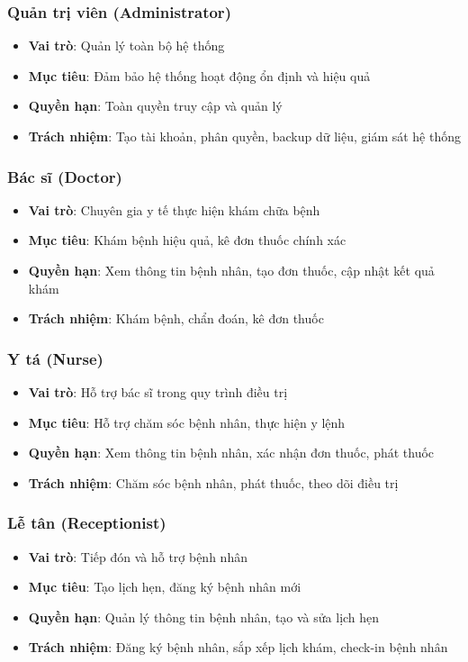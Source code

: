 \documentclass[12pt,a4paper]{report}
\begin{document}
    \subsubsection{Quản trị viên (Administrator)}
    \begin{itemize}
        \item \textbf{Vai trò}: Quản lý toàn bộ hệ thống
        \item \textbf{Mục tiêu}: Đảm bảo hệ thống hoạt động ổn định và hiệu quả
        \item \textbf{Quyền hạn}: Toàn quyền truy cập và quản lý
        \item \textbf{Trách nhiệm}: Tạo tài khoản, phân quyền, backup dữ liệu, giám sát hệ thống
    \end{itemize}

    \subsubsection{Bác sĩ (Doctor)}
    \begin{itemize}
        \item \textbf{Vai trò}: Chuyên gia y tế thực hiện khám chữa bệnh
        \item \textbf{Mục tiêu}: Khám bệnh hiệu quả, kê đơn thuốc chính xác
        \item \textbf{Quyền hạn}: Xem thông tin bệnh nhân, tạo đơn thuốc, cập nhật kết quả khám
        \item \textbf{Trách nhiệm}: Khám bệnh, chẩn đoán, kê đơn thuốc
    \end{itemize}

    \subsubsection{Y tá (Nurse)}
    \begin{itemize}
        \item \textbf{Vai trò}: Hỗ trợ bác sĩ trong quy trình điều trị
        \item \textbf{Mục tiêu}: Hỗ trợ chăm sóc bệnh nhân, thực hiện y lệnh
        \item \textbf{Quyền hạn}: Xem thông tin bệnh nhân, xác nhận đơn thuốc, phát thuốc
        \item \textbf{Trách nhiệm}: Chăm sóc bệnh nhân, phát thuốc, theo dõi điều trị
    \end{itemize}

    \subsubsection{Lễ tân (Receptionist)}
    \begin{itemize}
        \item \textbf{Vai trò}: Tiếp đón và hỗ trợ bệnh nhân
        \item \textbf{Mục tiêu}: Tạo lịch hẹn, đăng ký bệnh nhân mới
        \item \textbf{Quyền hạn}: Quản lý thông tin bệnh nhân, tạo và sửa lịch hẹn
        \item \textbf{Trách nhiệm}: Đăng ký bệnh nhân, sắp xếp lịch khám, check-in bệnh nhân
    \end{itemize}
\end{document}
